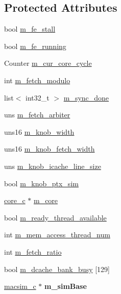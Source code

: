 \subsection*{Protected Attributes}
\begin{DoxyCompactItemize}
\item 
bool \hyperlink{classfrontend__c_a3ddc92b5614174fd7d77f4f0e7db5538}{m\_\-fe\_\-stall}
\item 
bool \hyperlink{classfrontend__c_ad209b62e2a8616d2fe15edfa54b2b513}{m\_\-fe\_\-running}
\item 
Counter \hyperlink{classfrontend__c_a64ef7913b57269b050b4ac4854c11317}{m\_\-cur\_\-core\_\-cycle}
\item 
int \hyperlink{classfrontend__c_abc56bb3ebfa3d76413b83c6174079c3c}{m\_\-fetch\_\-modulo}
\item 
list$<$ int32\_\-t $>$ \hyperlink{classfrontend__c_ac593d33a9e55678461f84b74a738fd3b}{m\_\-sync\_\-done}
\item 
uns \hyperlink{classfrontend__c_af1f0bce8b49a7903883ead8cba0a3963}{m\_\-fetch\_\-arbiter}
\item 
uns16 \hyperlink{classfrontend__c_a7ed5014f79e26e431bff9ffa7b52121b}{m\_\-knob\_\-width}
\item 
uns16 \hyperlink{classfrontend__c_ac044116ea86e033c922093d211cc2c9d}{m\_\-knob\_\-fetch\_\-width}
\item 
uns \hyperlink{classfrontend__c_a65a0c3afbe45a24ff11ef5c4efac6c61}{m\_\-knob\_\-icache\_\-line\_\-size}
\item 
bool \hyperlink{classfrontend__c_a30a952873e134a3f296ac90efee193f6}{m\_\-knob\_\-ptx\_\-sim}
\item 
\hyperlink{classcore__c}{core\_\-c} $\ast$ \hyperlink{classfrontend__c_a2e21eea52a0c6ee3c2e66daecd31b151}{m\_\-core}
\item 
bool \hyperlink{classfrontend__c_abe2dc05043fbc949b51dd87440ec1e5a}{m\_\-ready\_\-thread\_\-available}
\item 
int \hyperlink{classfrontend__c_a172f7f7447242af7808f4a68821194d2}{m\_\-mem\_\-access\_\-thread\_\-num}
\item 
int \hyperlink{classfrontend__c_aaee73e44aa9e8673b370f5f47d3a87e4}{m\_\-fetch\_\-ratio}
\item 
bool \hyperlink{classfrontend__c_a122be13c09b552fb5fd8fdfda289c9f2}{m\_\-dcache\_\-bank\_\-busy} \mbox{[}129\mbox{]}
\item 
\hypertarget{classfrontend__c_acfc08439756672debe6b15bb9a04d321}{
\hyperlink{classmacsim__c}{macsim\_\-c} $\ast$ {\bfseries m\_\-simBase}}
\label{classfrontend__c_acfc08439756672debe6b15bb9a04d321}

\end{DoxyCompactItemize}


